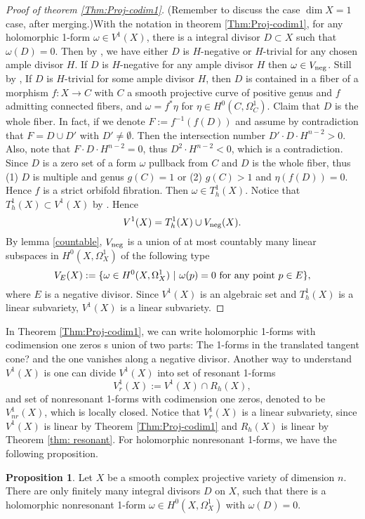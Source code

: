 \documentclass[a4paper,12pt,reqno]{amsart}
\theoremstyle{plain}
\theoremstyle{definition}
\newtheorem{proposition}[theorem]{Proposition}
\theoremstyle{remark}
\begin{document}
\begin{proof}[Proof  of theorem \ref{Thm:Proj-codim1}]
{\color{red}(Remember to discuss the case $\dim X=1$ case, after merging.)}With the notation in theorem \ref{Thm:Proj-codim1},  for any holomorphic 1-form $\omega\in V^1(X)$, there is a integral divisor $D\subset X$ such that $\omega(D)=0$. Then by \cite[theorem 2]{Sp88}, we have either $D$ is $H$-negative or $H$-trivial for any chosen ample divisor $H$. If $D$ is $H$-negative for any ample divisor $H$ then $\omega\in V_{\textnormal{neg}}$. Still by \cite[theorem 2]{Sp88}, If $D$ is $H$-trivial for some ample divisor $H$, then $D$ is contained in a fiber of a morphism $f: X\to C$ with $C$ a smooth projective curve of positive genus and $f$ admitting connected fibers, and $\omega=f^*\eta$ for $\eta\in H^0(C, \Omega_C^1)$. Claim that $D$ is the whole fiber. In fact, if we denote $F:=f^{-1}(f(D))$ and assume by contradiction that $F=D\cup D'$ with $D'\not=\emptyset$. Then the intersection number $D'\cdot D\cdot H^{n-2}>0$. Also, note that $F\cdot D\cdot H^{n-2}=0$, thus $D^2\cdot H^{n-2}<0$, which is a contradiction. Since $D$ is a zero set of a form $\omega$ pullback from $C$ and $D$ is the whole fiber, thus (1) $D$ is multiple and genus $g(C)=1$ or (2) $g(C)>1$ and $\eta(f(D))=0$. Hence $f$ is a strict orbifold fibration. Then $\omega\in T_h^1(X)$. Notice that $T_h^1(X)\subset V^1(X)$ by \cite{GL87}. Hence $$V^1(X)= T_h^1(X)\cup V_{\textnormal{neg}}(X).
$$
By lemma \ref{countable}, $V_{\textnormal{neg}}$ is a union of at most countably many linear subspaces in $H^0(X, \Omega_X^1)$ of the following type $$V_E(X):=\{\omega\in H^0(X, \Omega_X^1)\ |\ \omega(p)=0\  \textnormal{for any point}\ p\in E\},$$ where $E$ is a negative divisor. Since $V^1(X)$ is an algebraic set and $T_h^1(X)$ is a linear subvariety, $V^1(X)$ is a linear subvariety.
 \end{proof} 
 
 In Theorem \ref{Thm:Proj-codim1}, we can write holomorphic 1-forms with codimension one zeros s union of two parts: The 1-forms in the {\color{red} translated tangent cone?} and the one vanishes along a negative divisor.  Another way to understand  $V^1(X)$ is one can divide $V^1(X)$ into set of resonant 1-forms $$V^1_r(X):=V^1(X)\cap R_h(X),$$ and set of nonresonant 1-forms with codimension one zeros, denoted to be $V^1_{nr}(X)$, which is locally closed. Notice that $V_r^1(X)$ is a linear subvariety, since $V^1(X)$ is linear by Theorem \ref{Thm:Proj-codim1}  and $R_h(X)$ is linear by Theorem \ref{thm: resonant}. For holomorphic nonresonant 1-forms,  we have the following proposition.
 \begin{proposition}
Let $X$ be a smooth complex projective variety of dimension $n$. There are only finitely many integral divisors $D$ on $X$, such that there is a holomorphic nonresonant 1-form $\omega\in H^0(X, \Omega_X^1)$ with $\omega(D)=0$.
 \end{proposition}
 
\end{document}
